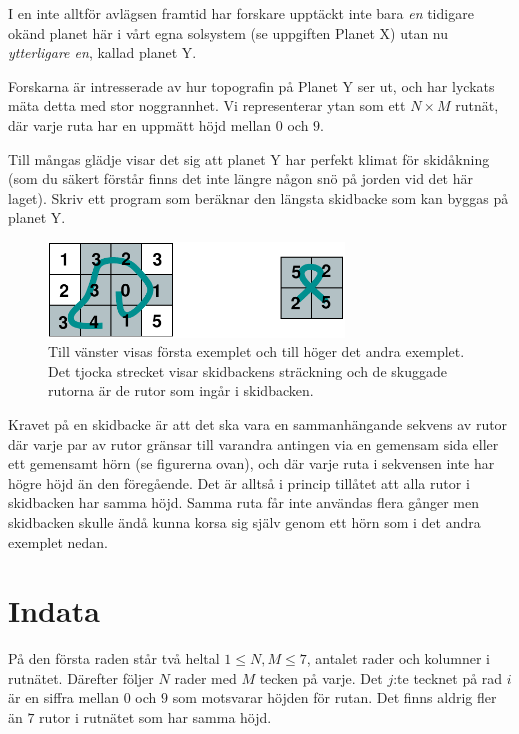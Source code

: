 
I en inte alltför avlägsen framtid har forskare upptäckt inte bara {\em en} tidigare okänd planet här i vårt egna solsystem (se uppgiften Planet X) utan nu {\em ytterligare en}, kallad planet Y.

Forskarna är intresserade av hur topografin på Planet Y ser ut, och har lyckats mäta detta med stor noggrannhet. Vi representerar ytan som ett $N \times M$ rutnät, där varje ruta har en uppmätt höjd mellan $0$ och $9$.

Till mångas glädje visar det sig att planet Y har perfekt klimat för skidåkning (som du säkert förstår finns det inte längre någon snö på jorden vid det här laget). Skriv ett program som beräknar den längsta skidbacke som kan byggas på planet Y.

\begin{figure}[h]
  \centering
      \includegraphics[width=0.7\textwidth]{planetbackefig2}
      \caption{Till vänster visas första exemplet och till höger det andra exemplet. Det tjocka strecket visar skidbackens sträckning och de skuggade rutorna är de rutor som ingår i skidbacken.}
\end{figure}

Kravet på en skidbacke är att det ska vara en sammanhängande sekvens av rutor där varje par av rutor gränsar till varandra antingen via en gemensam sida eller ett gemensamt hörn (se figurerna ovan), och där varje ruta i sekvensen inte har högre höjd än den föregående. Det är alltså i princip tillåtet att alla rutor i skidbacken har samma höjd. Samma ruta får inte användas flera gånger men skidbacken skulle ändå kunna korsa sig själv genom ett hörn som i det andra exemplet nedan.

\section*{Indata}
På den första raden står två heltal $1 \le N,M \le 7$, 
antalet rader och kolumner i rutnätet.
Därefter följer $N$ rader med $M$ tecken på varje.
Det $j$:te tecknet på rad $i$ är en siffra mellan
$0$ och $9$ som motsvarar höjden för rutan. Det finns aldrig fler än $7$ rutor i rutnätet som har samma höjd.

